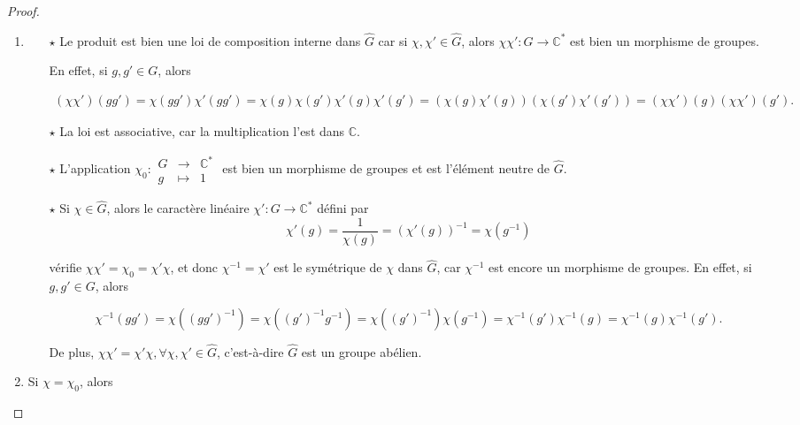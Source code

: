 \documentclass[french]{book}
\theoremstyle{definition}
\theoremstyle{remark}
\begin{document}
  \begin{proof}

    \

  \begin{enumerate}
    \item \begin{itemize}
      \item[$\star$] Le produit est bien une loi de composition interne dans \(\hat{G}\) car si \(\chi, \chi' \in \hat{G}\), alors \(\chi \chi' : G \longrightarrow \mathbb{C} ^{*}\) est bien un morphisme de groupes.

      En effet, si \(g, g' \in G\), alors

      \begin{gather*}
        (\chi \chi')(gg') = \chi(gg') \chi'(gg') = \chi(g)\chi(g') \chi'(g)\chi'(g') = (\chi(g) \chi'(g))(\chi(g')\chi'(g')) = (\chi\chi')(g)(\chi\chi')(g').
      \end{gather*}

      \item[$\star$] La loi est associative, car la multiplication l'est dans \(\mathbb{C}\).
      \item[$\star$] L'application \(\chi _{0} : \begin{matrix}
      G & \longrightarrow & \mathbb{C} ^{*} \\
      g & \longmapsto & 1
      \end{matrix}\) est bien un morphisme de groupes et est l'élément neutre de \(\hat{G}\).

      \item[$\star$] Si \(\chi \in \hat{G}\), alors le caractère linéaire \(\chi' : G \longrightarrow \mathbb{C} ^{*}\) défini par \[\chi'(g) = \frac{1}{\chi(g)} = (\chi'(g)) ^{-1} = \chi(g ^{-1})\]

      vérifie \(\chi \chi' = \chi _{0} = \chi'\chi\), et donc \(\chi ^{-1} = \chi'\) est le symétrique de \(\chi\) dans \(\hat{G} \), car \(\chi ^{-1}\) est encore un morphisme de groupes. En effet, si \(g, g' \in G\), alors

      \[\chi ^{-1}(gg') = \chi((gg') ^{-1}) = \chi ((g')^{-1} g ^{-1}) = \chi((g')^{-1}) \chi(g ^{-1}) = \chi ^{-1}(g') \chi ^{-1}(g) = \chi ^{-1}(g) \chi ^{-1}(g').\]

      De plus, \(\chi \chi' = \chi' \chi, \forall \chi, \chi' \in \hat{G}\), c'est-à-dire \(\hat{G}\) est un groupe abélien.
    \end{itemize}

    \item Si \(\chi = \chi_0\), alors


\end{enumerate}
\end{proof}
\end{document}
